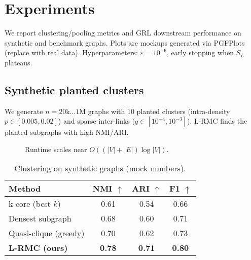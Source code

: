 \documentclass{article} %
\theoremstyle{remark}
\begin{document}
\section{Experiments}
We report clustering/pooling metrics and GRL downstream performance on synthetic and benchmark graphs. Plots are mockups generated via PGFPlots (replace with real data). Hyperparameters: \(\varepsilon=10^{-6}\), early stopping when \(S_L\) plateaus.

\subsection{Synthetic planted clusters}
We generate \(n=20\text{k} \ldots 1\text{M}\) graphs with 10 planted clusters (intra-density \(p\in[0.005,0.02]\)) and sparse inter-links (\(q\in[10^{-4},10^{-3}]\)). L-RMC finds the planted subgraphs with high NMI/ARI.

\begin{figure}[t]
\centering
{}
\caption{Runtime scales near \(O((|V|+|E|)\log|V|)\).}
\label{fig:runtime}
\end{figure}

\begin{table}[t]
\centering
\caption{Clustering on synthetic graphs (mock numbers).}
\label{tab:synthetic}
\begin{tabular}{lccc}
\toprule
Method & NMI $\uparrow$ & ARI $\uparrow$ & F1 $\uparrow$\\
\midrule
k-core (best $k$) & 0.61 & 0.54 & 0.66\\
Densest subgraph & 0.68 & 0.60 & 0.71\\
Quasi-clique (greedy) & 0.70 & 0.62 & 0.73\\
\textbf{L-RMC (ours)} & \textbf{0.78} & \textbf{0.71} & \textbf{0.80}\\
\bottomrule
\end{tabular}
\end{table}
\end{document}
